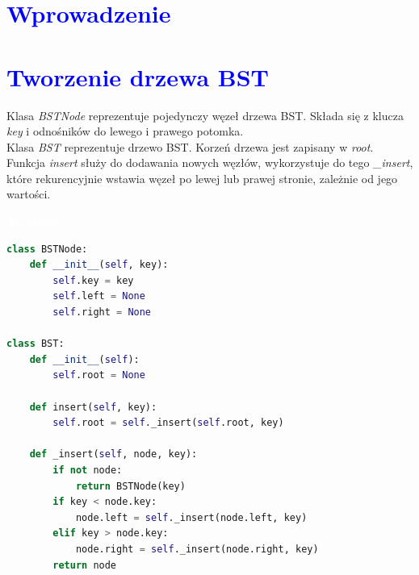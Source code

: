 \documentclass{article}
\begin{document}
	\titleformat{\section}{\Huge\bfseries}{\thesection}{2em}{}
	
	\section*{\textcolor{blue}{Wprowadzenie}}
	
	
	\titleformat{\section}{\Large\bfseries}{\thesection}{2em}{}
	\section*{\textcolor{blue}{Tworzenie drzewa BST}}
	\begin{multicols}{2}
		\noindent 
		Klasa \textit{BSTNode} reprezentuje pojedynczy węzeł drzewa BST. Składa się z klucza \textit{key} i odnośników do lewego i prawego potomka. \\ Klasa \textit{BST} reprezentuje drzewo BST. Korzeń drzewa jest zapisany w \textit{root}. Funkcja \textit{insert} służy do dodawania nowych węzłów, wykorzystuje do tego \textit{\_insert}, które rekurencyjnie wstawia węzeł po lewej lub prawej stronie, zależnie od jego wartości.
		\noindent 
		\begin{tcolorbox}[colback=black,colframe=gray!50!,arc=3mm,boxrule=0pt,left=0pt,right=0pt,width=\linewidth]
			\textcolor{white}{\textbf{\textsf{Terminal}}}\\
			
			\begin{lstlisting}[language=Python]
class BSTNode:
	def __init__(self, key):
		self.key = key
		self.left = None
		self.right = None

class BST:
	def __init__(self):
		self.root = None

	def insert(self, key):
		self.root = self._insert(self.root, key)

	def _insert(self, node, key):
		if not node:
			return BSTNode(key)
		if key < node.key:
			node.left = self._insert(node.left, key)
		elif key > node.key:
			node.right = self._insert(node.right, key)
		return node
			\end{lstlisting}
			
		\end{tcolorbox}
	\end{multicols}
	
\end{document}
